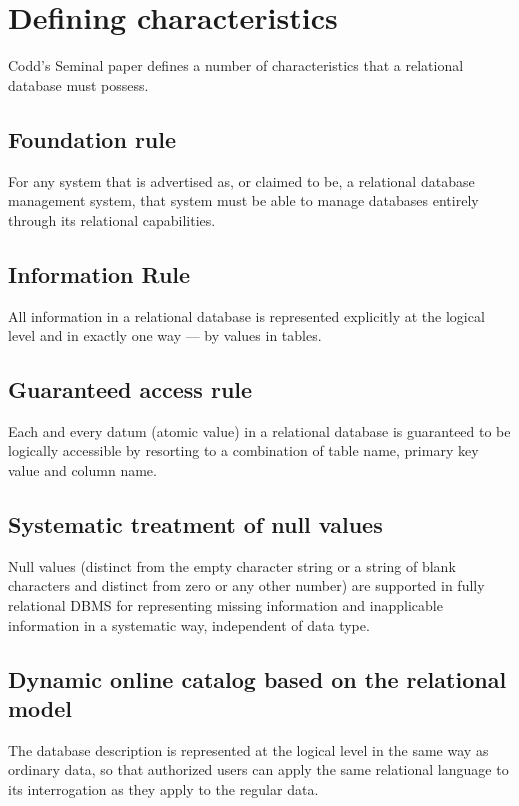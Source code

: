\documentclass[slides]{pgnotes}
\begin{document}
\section{Defining characteristics}

Codd's Seminal paper defines a number of characteristics that a relational database must possess.

\subsection{Foundation rule}
  For any system that is advertised as, or claimed to be, a relational database management system, that system must be able to manage databases entirely through its relational capabilities.
  
\subsection{Information Rule}
  All information in a relational database is represented explicitly at the logical level and in exactly one way --- by values in tables.

\subsection{Guaranteed access rule}
  Each and every datum (atomic value) in a relational database is guaranteed to be logically accessible by resorting to a combination of table name, primary key value and column name.

\subsection{Systematic treatment of null values}
  Null values (distinct from the empty character string or a string of blank characters and distinct from zero or any other number) are supported in fully relational DBMS for representing missing information and inapplicable information in a systematic way, independent of data type.

\subsection{Dynamic online catalog based on the relational model}
  The database description is represented at the logical level in the same way as ordinary data, so that authorized users can apply the same relational language to its interrogation as they apply to the regular data.
\end{document}
